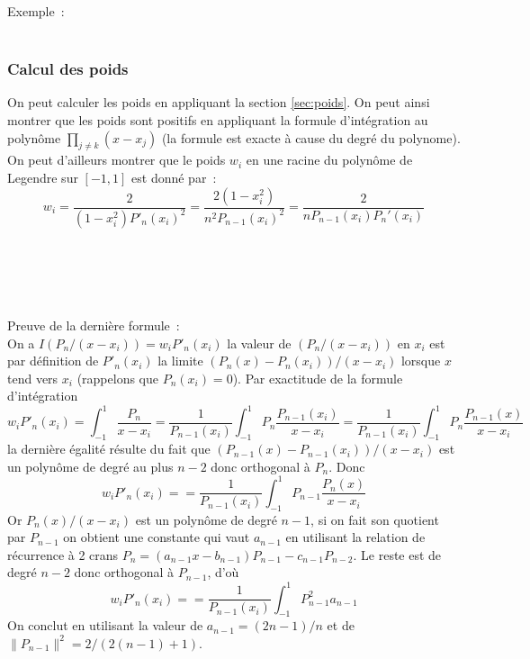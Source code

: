 \documentclass[a4paper,11pt]{article}
\begin{document}
\begin{giacjshere}
Exemple~:
\\
\\

\subsubsection{Calcul des poids}
On peut calculer les poids en appliquant
la section \ref{sec:poids}. On peut ainsi montrer
que les poids sont positifs en appliquant la formule
d'int\'egration au polyn\^ome
$\prod_{j\neq k}(x-x_j)$
(la formule est exacte \`a cause du degr\'e du polynome).
On peut d'ailleurs montrer que le poids $w_i$ 
en une racine du polyn\^ome de Legendre
sur $[-1,1]$ est donn\'e par~:
$$ w_i=\frac{2}{(1-x_i^2)P'_n(x_i)^2} = \frac{2(1-x_i^2)}{n^2P_{n-1}(x_i)^2}=\frac{2}{nP_{n-1}(x_i)P_n'(x_i)}$$
\\
\\
\\
\\
\\
Preuve de la derni\`ere formule~:\\
On a $I(P_n/(x-x_i))=w_i P'_n(x_i)$ la valeur de $(P_n/(x-x_i))$
en $x_i$ est par d\'efinition de $P'_n(x_i)$ la limite $(P_n(x)-P_n(x_i))/(x-x_i)$
lorsque $x$ tend vers $x_i$ (rappelons que $P_n(x_i)=0$).
Par exactitude de la formule d'int\'egration
$$w_i P'_n(x_i)=\int_{-1}^1 \frac{P_n}{x-x_i} =
\frac1{P_{n-1}(x_i)}\int_{-1}^1 P_n \frac{P_{n-1}(x_i)}{x-x_i} 
= \frac1{P_{n-1}(x_i)}\int_{-1}^1 P_n \frac{P_{n-1}(x)}{x-x_i} $$
la derni\`ere \'egalit\'e r\'esulte du fait que
$(P_{n-1}(x)-P_{n-1}(x_i))/(x-x_i)$
est un polyn\^ome de degr\'e au plus $n-2$ donc orthogonal \`a $P_n$.
Donc
$$w_i P'_n(x_i)=
= \frac1{P_{n-1}(x_i)}\int_{-1}^1 P_{n-1} \frac{P_n(x)}{x-x_i} $$
Or $P_n(x)/(x-x_i)$ est un polyn\^ome de degr\'e $n-1$, si on fait son
quotient par $P_{n-1}$ on obtient une constante qui vaut $a_{n-1}$ en
utilisant la relation de r\'ecurrence \`a 2 crans
$P_n=(a_{n-1}x-b_{n-1})P_{n-1}-c_{n-1}P_{n-2}$. Le reste est de
degr\'e $n-2$ donc orthogonal \`a $P_{n-1}$, d'o\`u
$$w_i P'_n(x_i)=
= \frac1{P_{n-1}(x_i)}\int_{-1}^1 P_{n-1}^2 a_{n-1} $$
On conclut en utilisant la valeur de $a_{n-1}=(2n-1)/n$ et de
$\| P_{n-1}\|^2=2/(2(n-1)+1)$.


\end{giacjshere}
\end{document}
